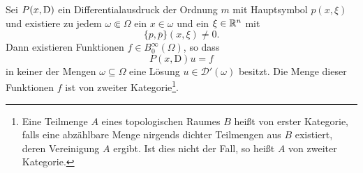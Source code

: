 \begin{thm}\label{thm:2_hoer}
Sei $P(x,\mathrm D)$ ein Differentialausdruck der Ordnung $m$ mit  Hauptsymbol $p(x,\xi)$ und existiere zu jedem $\omega\Subset\Omega$ 
ein $x\in\omega$ und ein $\xi\in\mathbb R^n$ mit
\begin{equation}
 \{p,\overline p\}(x,\xi)\ne 0.
\end{equation}
Dann existieren Funktionen $f\in B_0^\infty(\Omega)$, so dass
\begin{equation}\label{lewy:pxDu=f}
P(x,\mathrm D)u=f
\end{equation}
in keiner der Mengen $\omega\subseteq\Omega$ eine Lösung $u\in\mathscr D'(\omega)$ besitzt. Die Menge dieser Funktionen $f$ ist von zweiter Kategorie\footnote{Eine Teilmenge $A$ eines topologischen Raumes $B$ heißt von erster Kategorie, falls eine abzählbare Menge nirgends dichter Teilmengen aus $B$ existiert, deren Vereinigung $A$ ergibt. Ist dies nicht der Fall, so heißt $A$ von zweiter Kategorie.}.
\end{thm}

